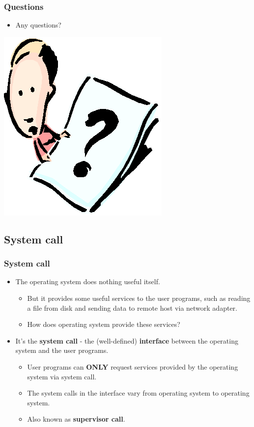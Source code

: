 \documentclass[CJKutf8,xcolor=pdftex,dvipsnames,table]{beamer}
\begin{document}
\begin{CJK*}{UTF8}{song}
  \begin{frame}
    \frametitle{Questions}
    \begin{itemize}
    \item{Any questions?}
    \end{itemize}
    \begin{center}
      \includegraphics[scale=.5]{question}
    \end{center}
  \end{frame}

  \subsection{System call}

  \begin{frame}
    \frametitle{System call} \pause
    \begin{itemize}
    \item{The operating system does nothing useful itself.} \pause
      \begin{itemize}
      \item{But it provides some useful services to the user programs, such as reading a file from disk and sending data to remote host via network adapter.} \pause
      \item{How does operating system provide these services?} \pause
      \end{itemize}
    \item{It's the \textbf{system call} \pause - the (well-defined) \textbf{interface} between the operating system and the user programs.} \pause
      \begin{itemize}
      \item{User programs can \textbf{ONLY} request services provided by the operating system via system call.} \pause
      \item{The system calls in the interface vary from operating system to operating system.} \pause
      \item{Also known as \textbf{supervisor call}.}
      \end{itemize}
    \end{itemize}
  \end{frame}


\end{CJK*}
\end{document}
